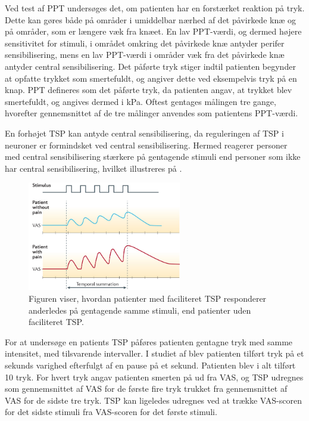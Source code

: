 Ved test af PPT undersøges det, om patienten har en forstærket reaktion på tryk. Dette kan gøres både på områder i umiddelbar nærhed af det påvirkede knæ og på områder, som er længere væk fra knæet. En lav PPT-værdi, og dermed højere sensitivitet for stimuli, i området omkring det påvirkede knæ antyder perifer sensibilisering, mens en lav PPT-værdi i områder væk fra det påvirkede knæ antyder central sensibilisering. \citep{Suokas2012} Det påførte tryk stiger indtil patienten begynder at opfatte trykket som smertefuldt, og angiver dette ved eksempelvis tryk på en knap. PPT defineres som det påførte tryk, da patienten angav, at trykket blev smertefuldt, og angives dermed i kPa. Oftest gentages målingen tre gange, hvorefter gennemsnittet af de tre målinger anvendes som patientens PPT-værdi. \citep{Petersen2015} \citep{Wylde2015b} 

En forhøjet TSP kan antyde central sensibilisering, da reguleringen af TSP i neuroner er formindsket ved central sensibilisering. \citep{Arendt-Nielsen2015b} Hermed reagerer personer med central sensibilisering stærkere på gentagende stimuli end personer som ikke har central sensibilisering, hvilket illustreres på . \citep{Arendt-Nielsen2015b} 

\begin{figure}[H] 
	\begin{center}
		\includegraphics[width=0.6\textwidth]{figures/dHTAanalyse/TSP_rask_syg.jpg}
	\end{center}
	\caption{Figuren viser, hvordan patienter med faciliteret TSP responderer anderledes på gentagende samme stimuli, end patienter uden faciliteret TSP. \citep{Reynolds2016}} 
	\label{fig:TSP_rask_syg} 
\end{figure} \vspace{-.25cm}

For at undersøge en patients TSP påføres patienten gentagne tryk med samme intensitet, med tilsvarende intervaller. I studiet af  blev patienten tilført tryk på et sekunds varighed efterfulgt af en pause på et sekund. Patienten blev i alt tilført 10 tryk. For hvert tryk angav patienten smerten på ud fra VAS, og TSP udregnes som gennemsnittet af VAS for de første fire tryk trukket fra gennemsnittet af VAS for de sidste tre tryk. \citep{Petersen2016} TSP kan ligeledes udregnes ved at trække VAS-scoren for det sidste stimuli fra VAS-scoren for det første stimuli. \citep{Petersen2015} 

